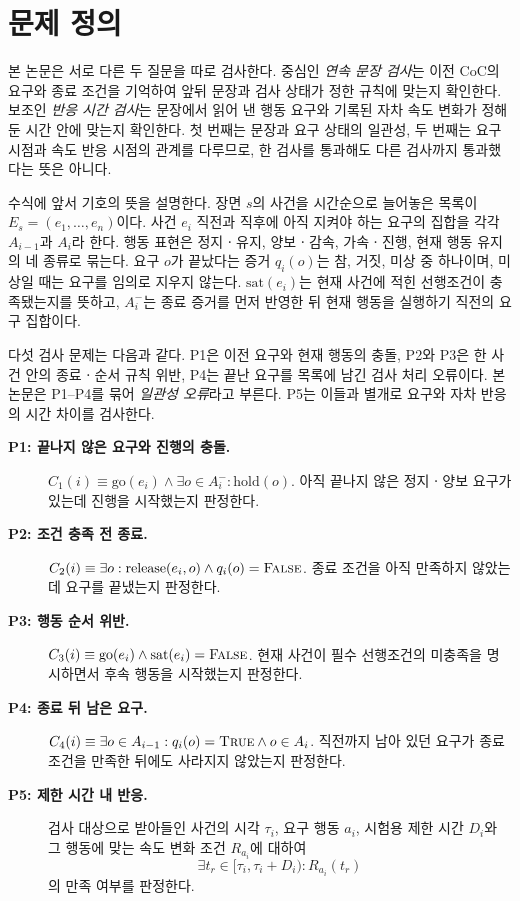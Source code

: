 \section{문제 정의}
\label{sec:problem}

본 논문은 서로 다른 두 질문을 따로 검사한다. 중심인 \emph{연속 문장 검사}는 이전 CoC의 요구와 종료 조건을 기억하여 앞뒤 문장과 검사 상태가 정한 규칙에 맞는지 확인한다. 보조인 \emph{반응 시간 검사}는 문장에서 읽어 낸 행동 요구와 기록된 자차 속도 변화가 정해 둔 시간 안에 맞는지 확인한다. 첫 번째는 문장과 요구 상태의 일관성, 두 번째는 요구 시점과 속도 반응 시점의 관계를 다루므로, 한 검사를 통과해도 다른 검사까지 통과했다는 뜻은 아니다.

수식에 앞서 기호의 뜻을 설명한다. 장면 $s$의 사건을 시간순으로 늘어놓은 목록이 $E_s=(e_1,\ldots,e_n)$이다. 사건 $e_i$ 직전과 직후에 아직 지켜야 하는 요구의 집합을 각각 $A_{i-1}$과 $A_i$라 한다. 행동 표현은 정지ㆍ유지, 양보ㆍ감속, 가속ㆍ진행, 현재 행동 유지의 네 종류로 묶는다. 요구 $o$가 끝났다는 증거 $q_i(o)$는 참, 거짓, 미상 중 하나이며, 미상일 때는 요구를 임의로 지우지 않는다. $\mathrm{sat}(e_i)$는 현재 사건에 적힌 선행조건이 충족됐는지를 뜻하고, $A_i^{-}$는 종료 증거를 먼저 반영한 뒤 현재 행동을 실행하기 직전의 요구 집합이다.

다섯 검사 문제는 다음과 같다. P1은 이전 요구와 현재 행동의 충돌, P2와 P3은 한 사건 안의 종료ㆍ순서 규칙 위반, P4는 끝난 요구를 목록에 남긴 검사 처리 오류이다. 본 논문은 P1--P4를 묶어 \emph{일관성 오류}라고 부른다. P5는 이들과 별개로 요구와 자차 반응의 시간 차이를 검사한다.
\begin{description}
\item[\textbf{P1: 끝나지 않은 요구와 진행의 충돌.}]
$C_1(i)\equiv \mathrm{go}(e_i)\land\exists o\in A_i^{-}:\mathrm{hold}(o)$. 아직 끝나지 않은 정지ㆍ양보 요구가 있는데 진행을 시작했는지 판정한다.

\item[\textbf{P2: 조건 충족 전 종료.}]
$C_2(i)\equiv\exists o:\mathrm{release}(e_i,o)\land q_i(o)=\textsc{False}$. 종료 조건을 아직 만족하지 않았는데 요구를 끝냈는지 판정한다.

\item[\textbf{P3: 행동 순서 위반.}]
$C_3(i)\equiv\mathrm{go}(e_i)\land\mathrm{sat}(e_i)=\textsc{False}$. 현재 사건이 필수 선행조건의 미충족을 명시하면서 후속 행동을 시작했는지 판정한다.

\item[\textbf{P4: 종료 뒤 남은 요구.}]
$C_4(i)\equiv\exists o\in A_{i-1}:q_i(o)=\textsc{True}\land o\in A_i$. 직전까지 남아 있던 요구가 종료 조건을 만족한 뒤에도 사라지지 않았는지 판정한다.

\item[\textbf{P5: 제한 시간 내 반응.}]
검사 대상으로 받아들인 사건의 시각 $\tau_i$, 요구 행동 $a_i$, 시험용 제한 시간 $D_i$와 그 행동에 맞는 속도 변화 조건 $R_{a_i}$에 대하여
\begin{equation}
\exists t_r\in[\tau_i,\tau_i+D_i):R_{a_i}(t_r)
\label{eq:response-contract}
\end{equation}
의 만족 여부를 판정한다.
\end{description}

